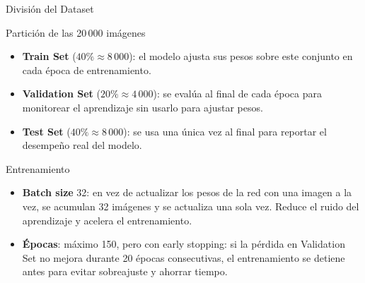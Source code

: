 \begin{frame}{División del Dataset}

    \begin{block}{Partición de las 20\,000 imágenes}
        \small
        \begin{itemize}
            \item \textbf{Train Set} ($40\% \approx 8\,000$): el modelo ajusta sus pesos sobre este conjunto en cada época de entrenamiento.
            \item \textbf{Validation Set} ($20\% \approx 4\,000$): se evalúa al final de cada época para monitorear el aprendizaje sin usarlo para ajustar pesos.
            \item \textbf{Test Set} ($40\% \approx 8\,000$): se usa una única vez al final para reportar el desempeño real del modelo.
        \end{itemize}
    \end{block}

    \begin{center}
    \end{center}

    \begin{block}{Entrenamiento}
        \small
        \begin{itemize}
            \item \textbf{Batch size} 32: en vez de actualizar los pesos de la red con una imagen a la vez, se acumulan 32 imágenes y se actualiza una sola vez. Reduce el ruido del aprendizaje y acelera el entrenamiento.
            \item \textbf{Épocas}: máximo 150, pero con early stopping: si la pérdida en Validation Set no mejora durante 20 épocas consecutivas, el entrenamiento se detiene antes para evitar sobreajuste y ahorrar tiempo.
        \end{itemize}
    \end{block}

\end{frame}

